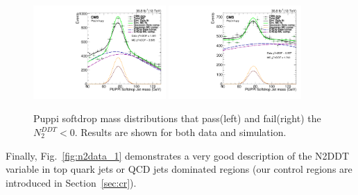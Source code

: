 \begin{figure}[h]
\centering
\includegraphics[width=0.45\textwidth]{figures/higgstagging/n2ddt/CombinedPlot_model_data_em_CA15.pdf}
\includegraphics[width=0.45\textwidth]{figures/higgstagging/n2ddt/CombinedPlot_model_data_failN2DDTcut_em_CA15.pdf}
\caption{Puppi softdrop mass distributions that pass(left) and fail(right) the $N_{2}^{DDT}<0$. Results are shown for both data and simulation.}
\label{fig:TotalFits}
\end{figure}



Finally, Fig.~\ref{fig:n2data_1} demonstrates a very good description of the N2DDT variable in top quark jets or QCD jets dominated regions (our control regions are introduced in Section~\ref{sec:cr}).


